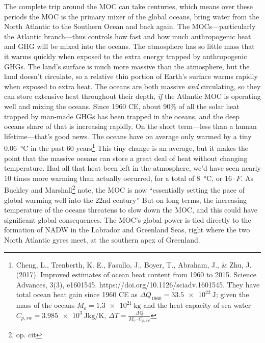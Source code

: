 \documentclass[amstex,12pt]{book}
\begin{document}
{The complete trip around the MOC can take centuries, which means over these periods the MOC is the primary mixer of the global oceans, bring water from the North Atlantic to the Southern Ocean and back again. The MOCs---particularly the Atlantic branch---thus controls how fast and how much anthropogenic heat and GHG will be mixed into the oceans. The atmosphere has so little mass that it warms quickly when exposed to the extra energy trapped by anthropogenic GHGs. The land's surface is much more massive than the atmosphere, but the land doesn't circulate, so a relative thin portion of Earth's surface warms rapidly when exposed to extra heat. The oceans are both massive \emph{and} circulating, so they can store extensive heat throughout their depth, \emph{if} the Atlantic MOC is operating well and mixing the oceans. Since 1960 CE, about 90\% of all the solar heat trapped by man-made GHGs has been trapped in the oceans, and the deep oceans share of that is increasing rapidly. On the short term---less than a human lifetime---that's good news. The oceans have on average only warmed by a tiny \SI{0.06}{\celsius} in the past 60 years\footnote{Cheng, L., Trenberth, K. E., Fasullo, J., Boyer, T., Abraham, J., \& Zhu, J. (2017). Improved estimates of ocean heat content from 1960 to 2015. Science Advances, 3(3), e1601545. https://doi.org/10.1126/sciadv.1601545. They have total ocean heat gain since 1960 CE as $\Delta Q_{1960}=\SI{33.5e22}{\joule}$; given the mass of the oceans $M_o=\SI{1.3e21}{\kilogram}$ and the heat capacity of sea water $C_{p, sw}=\SI{3.985e3}{\joule\kilogram\per\kelvin}$, $\Delta T=\frac{\Delta Q}{M_o\cdot C_{p, sw}}$} This tiny change is an average, but it makes the point that the massive oceans can store a great deal of heat without changing temperature. Had all that heat been left in the atmosphere, we'd have seen nearly 10 times more warming than actually occurred, for a total of \SI{8}{\celsius}, or $16\cdot F$. As Buckley and Marshall\footnote{op. cit} note, the MOC is now ``essentially setting the pace of global warming well into the 22nd century'' But on long terms, the increasing temperature of the oceans threatens to slow down the MOC, and this could have significant global consequences. The MOC's global power is tied directly to the formation of NADW in the Labrador and Greenland Seas, right where the two North Atlantic gyres meet, at the southern apex of Greenland.\\
}
\end{document}
